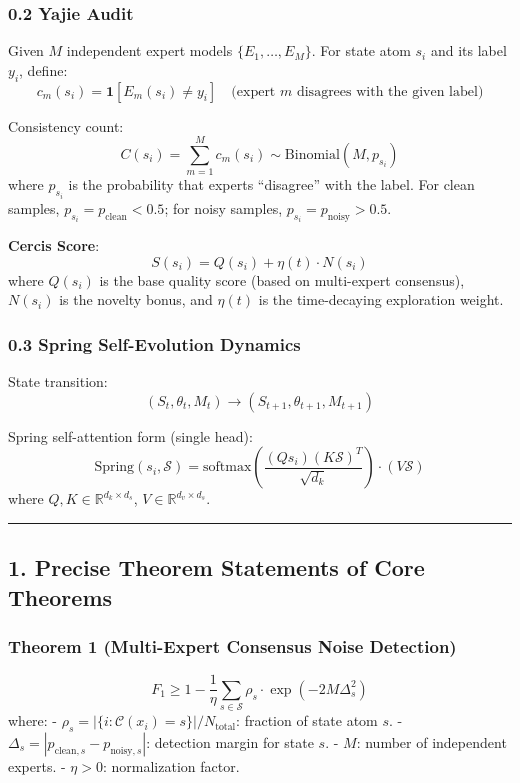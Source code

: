 \documentclass[
  12pt,
]{article}
\begin{document}
\subsubsection{0.2 Yajie Audit}\label{yajie-audit}

Given $M$ independent expert models $\{E_1, \ldots, E_M\}$. For state atom $s_i$ and its label $y_i$, define:
\[c_m(s_i) = \mathbf{1}[E_m(s_i) \neq y_i] \quad \text{(expert $m$ disagrees with the given label)}\]

Consistency count:
\[C(s_i) = \sum_{m=1}^{M} c_m(s_i) \sim \text{Binomial}(M, p_{s_i})\]
where $p_{s_i}$ is the probability that experts ``disagree'' with the label. For clean samples, $p_{s_i} = p_{\text{clean}} < 0.5$; for noisy samples, $p_{s_i} = p_{\text{noisy}} > 0.5$.

\textbf{Cercis Score}: \[S(s_i) = Q(s_i) + \eta(t) \cdot N(s_i)\]
where $Q(s_i)$ is the base quality score (based on multi-expert consensus), $N(s_i)$ is the novelty bonus, and $\eta(t)$ is the time-decaying exploration weight.

\subsubsection{0.3 Spring Self-Evolution Dynamics}\label{spring-self-evolution-dynamics}

State transition: \[(S_t, \theta_t, M_t) \to (S_{t+1}, \theta_{t+1}, M_{t+1})\]

Spring self-attention form (single head):
\[\text{Spring}(s_i, \mathcal{S}) = \text{softmax}\left(\frac{(Q s_i)(K \mathcal{S})^T}{\sqrt{d_k}}\right) \cdot (V \mathcal{S})\]
where $Q, K \in \mathbb{R}^{d_k \times d_s}$, $V \in \mathbb{R}^{d_v \times d_s}$.

\begin{center}\rule{0.5\linewidth}{0.5pt}\end{center}

\subsection{1. Precise Theorem Statements of Core Theorems}\label{precise-core-theorem-statements}

\subsubsection{Theorem 1 (Multi-Expert Consensus Noise Detection)}\label{theorem-1-multi-expert}

\[\boxed{F_1 \geq 1 - \frac{1}{\eta} \sum_{s \in \mathcal{S}} \rho_s \cdot \exp\left(-2M \Delta_s^2\right)}\]
where:
- $\rho_s = |\{i: \mathcal{C}(x_i) = s\}| / N_{\text{total}}$: fraction of state atom $s$.
- $\Delta_s = |p_{\text{clean},s} - p_{\text{noisy},s}|$: detection margin for state $s$.
- $M$: number of independent experts.
- $\eta > 0$: normalization factor.
\end{document}
